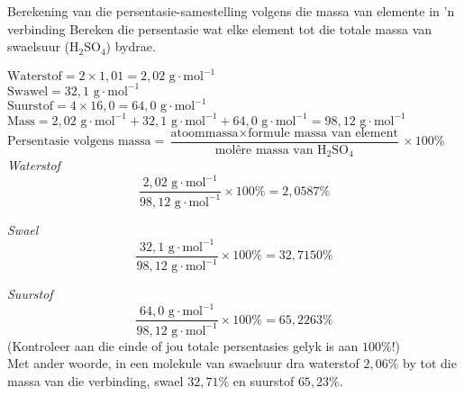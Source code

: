\begin{wex}{Berekening van die persentasie-samestelling volgens die  massa van elemente in 'n verbinding}
{
Bereken die persentasie wat elke element tot die totale massa van swaelsuur (${\text{H}}_{2}{\text{SO}}_{4}$) bydrae.
}
{
$\text{Waterstof}=2 \times 1,01 = 2,02 \text{ g} \cdot \text{mol}^{-1}$ \\ 
$\text{Swawel}=32,1 \text{ g} \cdot \text{mol}^{-1}$ \\
$\text{Suurstof}=4 \times 16,0 = 64,0 \text{ g} \cdot \text{mol}^{-1}$
$\text{Mass}=2,02 \text{ g} \cdot \text{mol}^{-1} + 32,1 \text{ g} \cdot \text{mol}^{-1} + 64,0 \text{ g} \cdot \text{mol}^{-1} = 98,12 \text{ g} \cdot \text{mol}^{-1}$
      \label{m38712*id280688}$\text{Persentasie volgens massa}=\dfrac{\text{atoommassa}\times \text{formule massa van element}}{\text{mol\^{e}re massa van H}{}_{2}\text{SO}{}_{4}} \times 100\%$ \\

        \textsl{Waterstof}      
      \label{m38712*id280735}\nopagebreak\noindent{}        
    \begin{equation*}
    \frac{2,02 \text{ g} \cdot \text{mol}^{-1}}{98,12 \text{ g} \cdot \text{mol}^{-1}}\ensuremath{\times}100\%=2,0587\%
      \end{equation*}

        \textsl{Swael}      
      \label{m38712*id280786}\nopagebreak\noindent{}        
    \begin{equation*}
    \frac{32,1 \text{ g} \cdot \text{mol}^{-1}}{98,12 \text{ g} \cdot \text{mol}^{-1}}\ensuremath{\times}100\%=32,7150\%
      \end{equation*}

        \textsl{Suurstof}     
      \label{m38712*id280837}\nopagebreak\noindent{}
    \begin{equation*}
    \frac{64,0 \text{ g} \cdot \text{mol}^{-1}}{98,12 \text{ g} \cdot \text{mol}^{-1}}\ensuremath{\times}100\%=65,2263\%
      \end{equation*}
      \label{m38712*id280876}(Kontroleer aan die einde of jou totale persentasies gelyk is aan $100\%$!) \\
      \label{m38712*id280880}Met ander woorde, in een molekule van swaelsuur dra waterstof $2,06\%$ by tot die massa van die verbinding, swael $32,71\%$ en suurstof $65,23\%$. 
}
    \end{wex}
